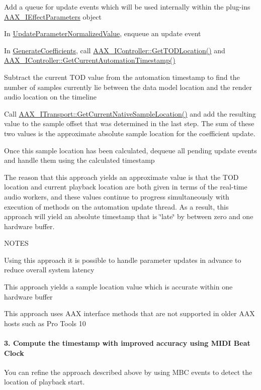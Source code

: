 \begin{DoxyEnumerate}
\item Add a queue for update events which will be used internally within the plug-\/in\textquotesingle{}s \hyperlink{a00099}{A\+A\+X\+\_\+\+I\+Effect\+Parameters} object  
\item In \hyperlink{a00061_a685858711efb8634ce66c327f2865c71}{Update\+Parameter\+Normalized\+Value}, enqueue an update event  
\item In \hyperlink{a00061_a083265b008921b6114ede387711694b7}{Generate\+Coefficients}, call \hyperlink{a00090_afbc2973d755b6c3ae82b6c8461e9fdee}{A\+A\+X\+\_\+\+I\+Controller\+::\+Get\+T\+O\+D\+Location()} and \hyperlink{a00090_af9ab9b228023e116f89249a56c27a20f}{A\+A\+X\+\_\+\+I\+Controller\+::\+Get\+Current\+Automation\+Timestamp()}  
\item Subtract the current T\+O\+D value from the automation timestamp to find the number of samples currently lie between the data model location and the render audio location on the timeline  
\item Call \hyperlink{a00116_a8119233b03774528ffaa519771d792a0}{A\+A\+X\+\_\+\+I\+Transport\+::\+Get\+Current\+Native\+Sample\+Location()} and add the resulting value to the sample offset that was determined in the last step. The sum of these two values is the approximate absolute sample location for the coefficient update.  
\item Once this sample location has been calculated, dequeue all pending update events and handle them using the calculated timestamp  
\end{DoxyEnumerate}

The reason that this approach yields an approximate value is that the T\+O\+D location and current playback location are both given in terms of the real-\/time audio workers, and these values continue to progress simultaneously with execution of methods on the automation update thread. As a result, this approach will yield an absolute timestamp that is \char`\"{}late\char`\"{} by between zero and one hardware buffer.

N\+O\+T\+E\+S \begin{DoxyItemize}
\item Using this approach it is possible to handle parameter updates in advance to reduce overall system latency \item This approach yields a sample location value which is accurate within one hardware buffer \item This approach uses A\+A\+X interface methods that are not supported in older A\+A\+X hosts such as Pro Tools 10\end{DoxyItemize}
\hypertarget{a00351_parameterUpdateTiming_determiningTimelinePosition_3}{}\paragraph{3. Compute the timestamp with improved accuracy using M\+I\+D\+I Beat Clock}\label{a00351_parameterUpdateTiming_determiningTimelinePosition_3}
You can refine the approach described above by using M\+B\+C events to detect the location of playback start.


